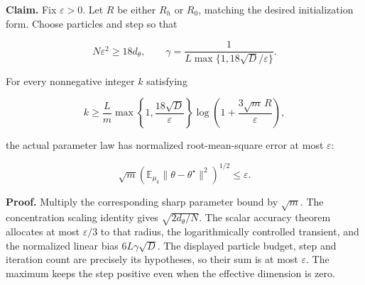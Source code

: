 \documentclass[11pt,a4paper]{article}
\begin{document}
\textbf{Claim.} Fix \(\varepsilon>0\). Let \(R\) be either \(R_h\) or \(R_0\), matching the desired initialization form. Choose particles and step so that

\[N\varepsilon^2\ge18d_\theta,\qquad \gamma=\frac1{L\max\{1,18\sqrt D/\varepsilon\}}.\]


For every nonnegative integer \(k\) satisfying

\[k\ge\frac Lm\max\!\left\{1,\frac{18\sqrt D}{\varepsilon}\right\}\log\!\left(1+\frac{3\sqrt m\,R}{\varepsilon}\right),\]


the actual parameter law has normalized root-mean-square error at most \(\varepsilon\):

\[\sqrt m\left(\mathbb E_{\mu_k}\|\theta-\theta^\star\|^2\right)^{1/2}\le\varepsilon.\]


\textbf{Proof.} Multiply the corresponding sharp parameter bound by \(\sqrt m\). The concentration scaling identity gives \(\sqrt{2d_\theta/N}\). The scalar accuracy theorem allocates at most \(\varepsilon/3\) to that radius, the logarithmically controlled transient, and the normalized linear bias \(6L\gamma\sqrt D\). The displayed particle budget, step and iteration count are precisely its hypotheses, so their sum is at most \(\varepsilon\). The maximum keeps the step positive even when the effective dimension is zero.
\end{document}
